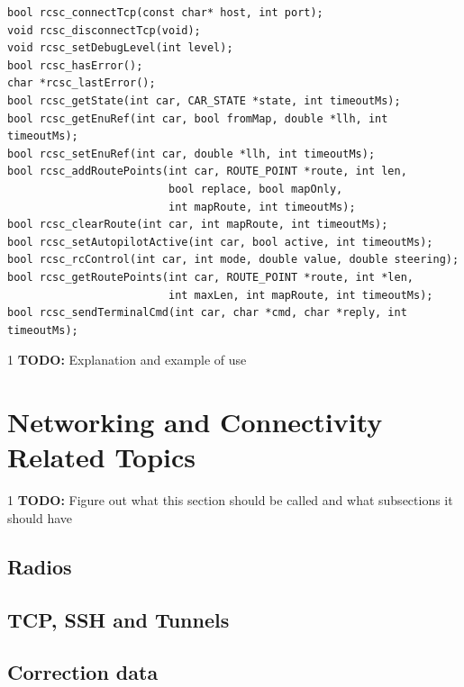 \documentclass[12pt]{article} %
\def\printtodos{0}
\newcommand{\todo}[1]{
  \if\printtodos1
      {\color{red} \textbf{TODO:} #1}
  \fi}
\begin{document}
\begin{Verbatim}
bool rcsc_connectTcp(const char* host, int port);
void rcsc_disconnectTcp(void);
void rcsc_setDebugLevel(int level);
bool rcsc_hasError();
char *rcsc_lastError();
bool rcsc_getState(int car, CAR_STATE *state, int timeoutMs);
bool rcsc_getEnuRef(int car, bool fromMap, double *llh, int timeoutMs);
bool rcsc_setEnuRef(int car, double *llh, int timeoutMs);
bool rcsc_addRoutePoints(int car, ROUTE_POINT *route, int len,
                         bool replace, bool mapOnly,
                         int mapRoute, int timeoutMs);
bool rcsc_clearRoute(int car, int mapRoute, int timeoutMs);
bool rcsc_setAutopilotActive(int car, bool active, int timeoutMs);
bool rcsc_rcControl(int car, int mode, double value, double steering);
bool rcsc_getRoutePoints(int car, ROUTE_POINT *route, int *len,
                         int maxLen, int mapRoute, int timeoutMs);
bool rcsc_sendTerminalCmd(int car, char *cmd, char *reply, int timeoutMs);
\end{Verbatim} 


\todo{Explanation and example of use} 


\section{Networking and Connectivity Related Topics}

\todo{Figure out what this section should be called and what subsections it should have}

\subsection{Radios} 

\subsection{TCP, SSH and Tunnels}

\subsection{Correction data}
\end{document}
